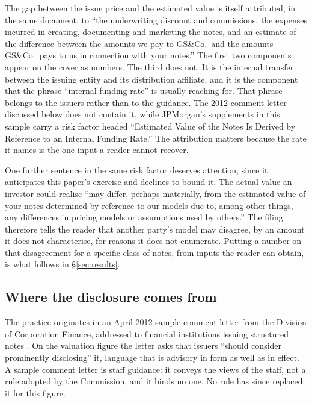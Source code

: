 The gap between the issue price and the estimated value is itself attributed,
in the same document, to ``the underwriting discount and commissions, the
expenses incurred in creating, documenting and marketing the notes, and an
estimate of the difference between the amounts we pay to GS\&Co.\ and the
amounts GS\&Co.\ pays to us in connection with your notes.'' The first two
components appear on the cover as numbers. The third does not. It is the
internal transfer between the issuing entity and its distribution affiliate,
and it is the component that the phrase ``internal funding rate'' is usually
reaching for. That phrase belongs to the issuers rather than to the guidance. The 2012
comment letter discussed below does not contain it, while JPMorgan's supplements
in this sample carry a risk factor headed ``Estimated Value of the Notes Is
Derived by Reference to an Internal Funding Rate.'' The attribution matters
because the rate it names is the one input a reader cannot recover.

One further sentence in the same risk factor deserves attention, since it
anticipates this paper's exercise and declines to bound it. The actual value an
investor could realise ``may differ, perhaps materially, from the estimated
value of your notes determined by reference to our models due to, among other
things, any differences in pricing models or assumptions used by others.'' The
filing therefore tells the reader that another party's model may disagree, by
an amount it does not characterise, for reasons it does not enumerate. Putting
a number on that disagreement for a specific class of notes, from inputs the
reader can obtain, is what follows in \S\ref{sec:results}.

\subsection{Where the disclosure comes from}

The practice originates in an April 2012 sample comment letter from the
Division of Corporation Finance, addressed to financial institutions issuing
structured notes \citep{SEC2012}. On the valuation figure the letter asks that
issuers ``should consider prominently disclosing'' it, language that is
advisory in form as well as in effect. A sample comment letter is staff
guidance: it conveys the views of the staff, not a rule adopted by the
Commission, and it binds no one. No rule has since replaced it for this figure.

